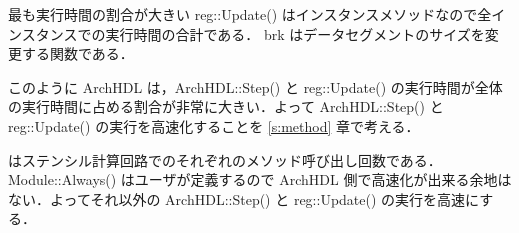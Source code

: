 最も実行時間の割合が大きい reg::Update() はインスタンスメソッドなので全インスタンスでの実行時間の合計である．
brk はデータセグメントのサイズを変更する関数である．

このように ArchHDL は，ArchHDL::Step() と reg::Update()
の実行時間が全体の実行時間に占める割合が非常に大きい．よって
ArchHDL::Step() と reg::Update() の実行を高速化することを \ref{s:method}
章で考える．

はステンシル計算回路でのそれぞれのメソッド呼び出し回数である．Module::Always()
はユーザが定義するので ArchHDL
側で高速化が出来る余地はない．よってそれ以外の ArchHDL::Step() と
reg::Update() の実行を高速にする．

\fi